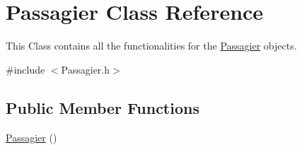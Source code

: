 \hypertarget{classPassagier}{}\section{Passagier Class Reference}
\label{classPassagier}


This Class contains all the functionalities for the \hyperlink{classPassagier}{Passagier} objects.  




{\ttfamily \#include $<$Passagier.\+h$>$}

\subsection*{Public Member Functions}
\begin{DoxyCompactItemize}
\item 
\hyperlink{classPassagier_a1a2bc82f5780448cd2a9a47d08cc824f}{Passagier} ()\hypertarget{classPassagier_a1a2bc82f5780448cd2a9a47d08cc824f}{}\label{classPassagier_a1a2bc82f5780448cd2a9a47d08cc824f}


\end{DoxyCompactItemize}
